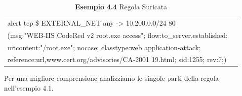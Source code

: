 \documentclass[binding=0.6cm]{sapthesis}
\theoremstyle{definition}
\begin{document}
\begin{table}[ht]
    \centering
    \caption*{\textbf{Esempio 4.4} Regola Suricata}
    \begin{tabular}{ |l|c|}
        \hline
        alert tcp \$ EXTERNAL\_NET any -> 10.200.0.0/24 80 \\
        (msg:"WEB-IIS CodeRed v2 root.exe access"; flow:to\_server,established;\\
         uricontent:"/root.exe"; nocase; classtype:web application-attack; \\
         reference:url,www.cert.org/advisories/CA-2001 19.html; sid:1255; rev:7;)\\
        \hline
    \end{tabular}
\end{table}

Per una migliore comprensione analizziamo le singole parti della regola nell'esempio 4.1.
\end{document}
